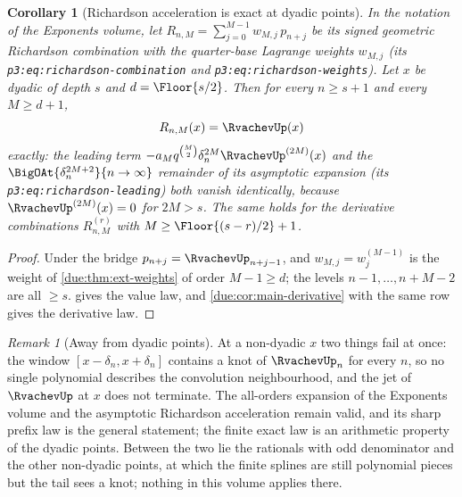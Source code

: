 \documentclass[11pt,oneside]{article}
\theoremstyle{plain}
\newtheorem{corollary}[theorem]{Corollary}
\theoremstyle{definition}
\theoremstyle{remark}
\newtheorem{remark}[theorem]{Remark}
\newcommand{\upn}[1]{\RvachevUp_{#1}}
\newcommand{\am}[1]{a_{#1}}                                 %
\newcommand{\Wrow}[2]{w^{(#1)}_{#2}}                        %
\begin{document}
\begin{corollary}[Richardson acceleration is exact at dyadic points]
\label{due:cor:sharp-richardson}
In the notation of the Exponents volume, let
$R_{n,M}=\sum_{j=0}^{M-1}w_{M,j}\,p_{n+j}$ be its signed geometric
Richardson combination with the quarter-base Lagrange weights $w_{M,j}$
(its \texttt{p3:eq:richardson-\allowbreak combination} and
\texttt{p3:eq:richardson-\allowbreak weights}).  Let $x$ be dyadic of depth $s$ and
$d=\Floor{s/2}$.  Then for every $n\ge s+1$ and every $M\ge d+1$,
\begin{equation}
 R_{n,M}(x)=\RvachevUp(x)
 \label{due:eq:sharp-richardson-exact}
\end{equation}
exactly: the leading term $-\am{M}q^{\binom M2}\delta_{n}^{2M}\RvachevUp^{(2M)}(x)$
and the $\BigOAt{\delta_{n}^{2M+2}}{n\to\infty}$ remainder of its asymptotic
expansion (its \texttt{p3:eq:richardson-leading}) both vanish identically,
because
$\RvachevUp^{(2M)}(x)=0$ for $2M>s$.  The same holds for the derivative
combinations $R^{(r)}_{n,M}$ with $M\ge\Floor{(s-r)/2}+1$.
\end{corollary}

\begin{proof}
Under the bridge $p_{n+j}=\upn{n+j-1}$, and $w_{M,j}=\Wrow{M-1}{j}$ is the
weight of \cref{due:thm:ext-weights} of order $M-1\ge d$; the levels
$n-1,\ldots,n+M-2$ are all $\ge s$.   gives the
value law, and \cref{due:cor:main-derivative} with the same row gives the
derivative law.
\end{proof}

\begin{remark}[Away from dyadic points]
\label{due:rmk:sharp-nondyadic}
At a non-dyadic $x$ two things fail at once: the window
$[x-\delta_n,x+\delta_n]$ contains a knot of $\upn{n}$ for every $n$, so
no single polynomial describes the convolution neighbourhood, and the jet
of $\RvachevUp$ at $x$ does not terminate.  The all-orders expansion of the
Exponents volume and the asymptotic Richardson acceleration remain valid,
and its sharp prefix law is the general statement; the finite exact law is
an arithmetic property of the dyadic points.  Between the two lie the
rationals with odd denominator and the other non-dyadic points, at which
the finite splines are still polynomial pieces but the tail sees a knot;
nothing in this volume applies there.
\end{remark}
\end{document}

